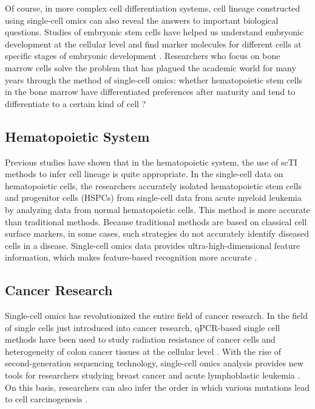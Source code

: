 Of course, in more complex cell differentiation systems, cell lineage constructed using single-cell omics can also reveal the answers to important biological questions. Studies of embryonic stem cells have helped us understand embryonic development at the cellular level and find marker molecules for different cells at specific stages of embryonic development
\parencite{haghverdi_diffusion_2016,haghverdi_diffusion_2015}. Researchers who focus on bone marrow cells solve the problem that has plagued the academic world for many years through the method of single-cell omics: whether hematopoietic stem cells in the bone marrow have differentiated preferences after maturity and tend to differentiate to a certain kind of cell ? \parencite{paul_transcriptional_2015,olsson_single-cell_2016} 

\subsection{Hematopoietic System}

Previous studies have shown that in the hematopoietic system, the use of scTI methods to infer cell lineage is quite appropriate. In the single-cell data on hematopoietic cells, the researchers accurately isolated hematopoietic stem cells and progenitor cells (HSPCs) from single-cell data from acute myeloid leukemia by analyzing data from normal hematopoietic cells. This method is more accurate than traditional methods. Because traditional methods are based on classical cell surface markers, in some cases, such strategies do not accurately identify diseased cells in a disease. Single-cell omics data provides ultra-high-dimensional feature information, which makes feature-based recognition more accurate \parencite{levine_data-driven_2015}.

\subsection{Cancer Research}

Single-cell omics has revolutionized the entire field of cancer research. In the field of single cells just introduced into cancer research, qPCR-based single cell methods have been used to study radiation resistance of cancer cells and heterogeneity of colon cancer tissues at the cellular level 
\parencite{diehn_association_2009, dalerba_single-cell_2011}. With the rise of second-generation sequencing technology, single-cell omics analysis provides new tools for researchers studying breast cancer and acute lymphoblastic leukemia \parencite{wang_clonal_2014, gawad_dissecting_2014}. On this basis, researchers can also infer the order in which various mutations lead to cell carcinogenesis \parencite{corces-zimmerman_preleukemic_2014,jan_clonal_2012}. \\

